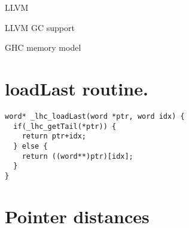 \documentclass[a4paper,oneside]{memoir}
\begin{document}




LLVM\cite{LLVM}

LLVM GC support\cite{LLVMGC}

GHC memory model \cite{GHCCommentary}





\appendix
\lstset{language=c}

\chapter{loadLast routine.}
\label{loadLast_code}

\begin{lstlisting}
word* _lhc_loadLast(word *ptr, word idx) {
  if(_lhc_getTail(*ptr)) {
    return ptr+idx;
  } else {
    return ((word**)ptr)[idx];
  }
}
\end{lstlisting}

\chapter{Pointer distances}
\label{pointer_distances}
\end{document}
